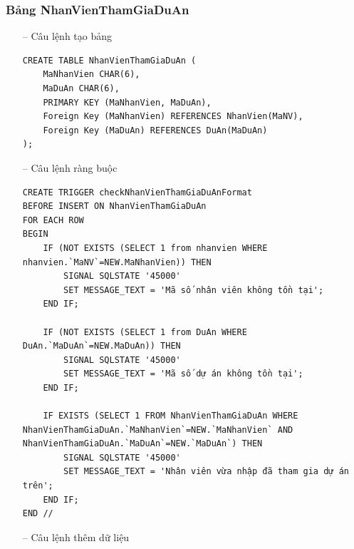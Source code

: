 \subsubsection{Bảng NhanVienThamGiaDuAn}
\begin{itemize}
    \item [--] Câu lệnh tạo bảng
    \begin{verbatim}
CREATE TABLE NhanVienThamGiaDuAn (
    MaNhanVien CHAR(6),
    MaDuAn CHAR(6),
    PRIMARY KEY (MaNhanVien, MaDuAn),
    Foreign Key (MaNhanVien) REFERENCES NhanVien(MaNV),
    Foreign Key (MaDuAn) REFERENCES DuAn(MaDuAn)
);
    \end{verbatim}
    \item [--] Câu lệnh ràng buộc
    \begin{verbatim}
CREATE TRIGGER checkNhanVienThamGiaDuAnFormat 
BEFORE INSERT ON NhanVienThamGiaDuAn
FOR EACH ROW
BEGIN
    IF (NOT EXISTS (SELECT 1 from nhanvien WHERE nhanvien.`MaNV`=NEW.MaNhanVien)) THEN
        SIGNAL SQLSTATE '45000'
        SET MESSAGE_TEXT = 'Mã số nhân viên không tồn tại';
    END IF;

    IF (NOT EXISTS (SELECT 1 from DuAn WHERE DuAn.`MaDuAn`=NEW.MaDuAn)) THEN
        SIGNAL SQLSTATE '45000'
        SET MESSAGE_TEXT = 'Mã số dự án không tồn tại';
    END IF;

    IF EXISTS (SELECT 1 FROM NhanVienThamGiaDuAn WHERE NhanVienThamGiaDuAn.`MaNhanVien`=NEW.`MaNhanVien` AND NhanVienThamGiaDuAn.`MaDuAn`=NEW.`MaDuAn`) THEN
        SIGNAL SQLSTATE '45000'
        SET MESSAGE_TEXT = 'Nhân viên vừa nhập đã tham gia dự án trên';
    END IF;
END //
    \end{verbatim}
    \newpage
    \item [--] Câu lệnh thêm dữ liệu
   \begin{verbatim}


\end{verbatim}
\end{itemize}
